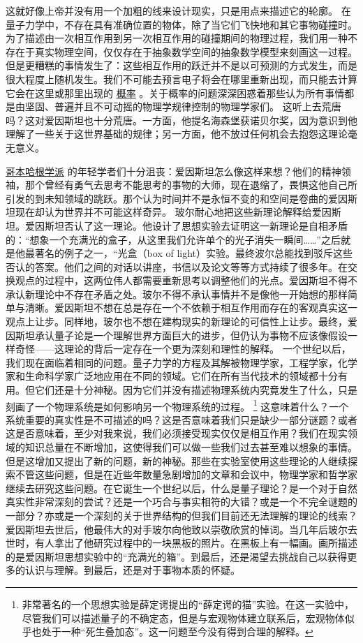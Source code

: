     这就好像上帝并没有用一个加粗的线来设计现实，只是用点来描述它的轮廓。
    在量子力学中，不存在具有准确位置的物体，除了当它们飞快地和其它事物碰撞时。为了描述由一次相互作用到另一次相互作用的碰撞期间的物理过程，我们用一种不存在于真实物理空间，仅仅存在于抽象数学空间的抽象数学模型来刻画这一过程。但是更糟糕的事情发生了：这些相互作用的跃迁并不是以可预测的方式发生，而是很大程度上随机发生。我们不可能去预言电子将会在哪里重新出现，而只能去计算它会在这里或那里出现的
\href{http://toyhouse.cc/wiki/index.php/概率}{概率}
。关于概率的问题深深困惑着那些认为所有事情都是由坚固、普遍并且不可动摇的物理学规律控制的物理学家们。   
    这听上去荒唐吗？这对爱因斯坦也十分荒唐。一方面，他提名海森堡获诺贝尔奖，因为意识到他理解了一些关于这世界基础的规律；另一方面，他不放过任何机会去抱怨这理论毫无意义。
    
\href{https://en.wikipedia.org/wiki/Niels Bohr Institute}{哥本哈根学派}
的年轻学者们十分沮丧：爱因斯坦怎么像这样来想？他们的精神领袖，那个曾经有勇气去思考不能思考的事物的大师，现在退缩了，畏惧这他自己所引发的到未知领域的跳跃。那个认为时间并不是永恒不变的和空间是卷曲的爱因斯坦现在却认为世界并不可能这样奇异。
    玻尔耐心地把这些新理论解释给爱因斯坦。爱因斯坦否认了这一理论。他设计了思想实验去证明这一新理论是自相矛盾的：“想象一个充满光的盒子，从这里我们允许单个的光子消失一瞬间……”之后就是他最著名的例子之一，“光盒（box of light）实验。最终波尔总能找到驳斥这些否认的答案。他们之间的对话以讲座，书信以及论文等等方式持续了很多年。在交换观点的过程中，这两位伟人都需要重新思考以调整他们的光点。爱因斯坦不得不承认新理论中不存在矛盾之处。玻尔不得不承认事情并不是像他一开始想的那样简单与清晰。爱因斯坦不想在总是存在一个不依赖于相互作用而存在的客观真实这一观点上让步。同样地，玻尔也不想在建构现实的新理论的可信性上让步。最终，爱因斯坦承认量子论是一个理解世界方面巨大的进步，但仍认为事物不应该像假设一样奇怪——这理论的背后一定存在一个更为深刻和理性的解释。
    一个世纪以后，我们现在面临着相同的问题。量子力学的方程及其解被物理学家，工程学家，化学家和生命科学家广泛地应用在不同的领域。它们在所有当代技术的领域都十分有用。但它们还是十分神秘。因为它们并没有描述物理系统内究竟发生了什么，只是刻画了一个物理系统是如何影响另一个物理系统的过程。
\footnote[4]
{
非常著名的一个思想实验是薛定谔提出的“薛定谔的猫”实验。在这一实验中，尽管我们可以描述量子的不确定态，但是与宏观物体建立联系后，宏观物体似乎也处于一种“死生叠加态”。这一问题至今没有得到合理的解释。
}
    这意味着什么？一个系统重要的真实性是不可描述的吗？这是否意味着我们只是缺少一部分谜题？或者这是否意味着，至少对我来说，我们必须接受现实仅仅是相互作用？我们在现实领域的知识总量在不断增加，这使得我们可以做一些我们过去甚至难以想象的事情。但是这增加又提出了新的问题，新的神秘。那些在实验室使用这些理论的人继续探索不管这些问题，但是在近些年数量急剧增加的文章和会议中，物理学家和哲学家继续去研究这些问题。在它诞生一个世纪以后，什么是量子理论？是一个对于自然真实性非常深刻的尝试？还是一个巧合与事实相符的大错？或是一个不完全谜题的一部分？亦或是一个深刻的关于世界结构的但我们目前还无法理解的理论的线索？
    爱因斯坦去世后，他最伟大的对手玻尔向他致以崇敬欣赏的悼词。当几年后玻尔去世时，有人拿出了他研究过程中的一块黑板的照片。在黑板上有一幅画。画所描述的是爱因斯坦思想实验中的“充满光的箱”。到最后，还是渴望去挑战自己以获得更多的认识与理解。到最后，还是对于事物本质的怀疑。


\noindent
